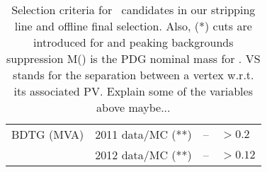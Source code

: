 \begin{table}[htb]
{\begin{tabular}{|l|r|l|l|}
      \hline \hline  
      BDTG (MVA)     & 2011 data/MC (**)                        & --                        & $>0.2$                      \\
      {}             & 2012 data/MC (**)                        & --                        & $>0.12$                     \\
      \hline
    \end{tabular}}
  \caption{Selection criteria for \BsJpsiKst\ candidates in our stripping line and offline final selection. Also, (*) cuts are introduced for \LbJpsipK and \LbJpsippi peaking backgrounds suppression 
           M(\jpsi) is the PDG nominal mass for \jpsi. VS stands for the separation between a vertex w.r.t. its associated PV. {\color{red} Explain some of the variables above maybe...}}
  \label{Bs2JpsiKstSelection}
\end{table}

